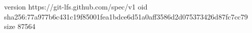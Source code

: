 version https://git-lfs.github.com/spec/v1
oid sha256:77a977b6c431c19f85001fea1bdce6d51a0aff3586d2d075373426d87fc7cc79
size 87564
